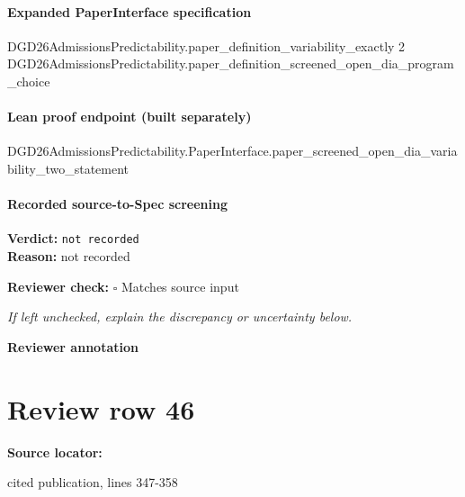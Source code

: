 \documentclass[10pt]{article}
\newcommand{\reviewerbox}{%
  \par\noindent\fbox{\parbox{0.96\linewidth}{\rule{0pt}{0.38in}}}\par
}
\newcommand{\reviewmatch}[1]{%
  \par\noindent\textbf{Reviewer check:} $\square$\; #1\par
  \noindent\emph{If left unchecked, explain the discrepancy or uncertainty below.}\par
}
\begin{document}
\paragraph{Expanded PaperInterface specification}
\begin{ReviewVerbatim}
DGD26AdmissionsPredictability.paper_definition_variability_exactly 2
  DGD26AdmissionsPredictability.paper_definition_screened_open_dia_program_choice
\end{ReviewVerbatim}

\paragraph{Lean proof endpoint (built separately)}\begin{ReviewVerbatim}
DGD26AdmissionsPredictability.PaperInterface.paper_screened_open_dia_variability_two_statement
\end{ReviewVerbatim}

\paragraph{Recorded source-to-Spec screening}
\textbf{Verdict:} \texttt{not recorded}
\\
\textbf{Reason:} not recorded
\reviewmatch{Matches source input}
\noindent\textbf{Reviewer annotation}\par
\reviewerbox
\clearpage
\hypertarget{source-claim-68c8be83630deedf}{}
\section*{Review row 46}
\textbf{Source locator:} {\footnotesize\raggedright cited publication, lines 347-\allowbreak{}358\par}
\end{document}
